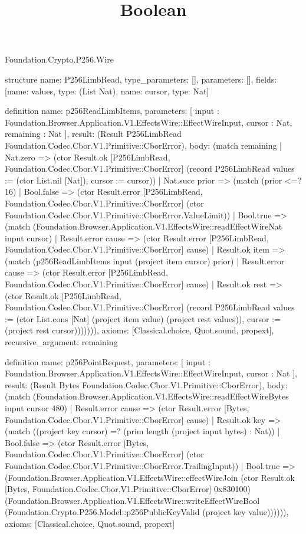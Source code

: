\begin{lexlean}{Foundation.Crypto.P256.Wire}
\title{Boolean}
\begin{semanticmodule}
structure{
  name: P256LimbRead,
  type_parameters: [],
  parameters: [],
  fields: [{name: values, type: (List Nat)}, {name: cursor, type: Nat}]
}

definition{
  name: p256ReadLimbItems,
  parameters: [
    input : Foundation.Browser.Application.V1.EffectsWire::EffectWireInput,
    cursor : Nat,
    remaining : Nat
  ],
  result: (Result P256LimbRead Foundation.Codec.Cbor.V1.Primitive::CborError),
  body: (match remaining
    | Nat.zero => (ctor Result.ok [P256LimbRead, Foundation.Codec.Cbor.V1.Primitive::CborError] (record P256LimbRead {values := (ctor List.nil [Nat]), cursor := cursor}))
    | Nat.succ prior => (match (prior <=? 16)
      | Bool.false => (ctor Result.error [P256LimbRead, Foundation.Codec.Cbor.V1.Primitive::CborError] (ctor Foundation.Codec.Cbor.V1.Primitive::CborError.ValueLimit))
      | Bool.true => (match (Foundation.Browser.Application.V1.EffectsWire::readEffectWireNat input cursor)
        | Result.error cause => (ctor Result.error [P256LimbRead, Foundation.Codec.Cbor.V1.Primitive::CborError] cause)
        | Result.ok item => (match (p256ReadLimbItems input (project item cursor) prior)
          | Result.error cause => (ctor Result.error [P256LimbRead, Foundation.Codec.Cbor.V1.Primitive::CborError] cause)
          | Result.ok rest => (ctor Result.ok [P256LimbRead, Foundation.Codec.Cbor.V1.Primitive::CborError] (record P256LimbRead {values := (ctor List.cons [Nat] (project item value) (project rest values)), cursor := (project rest cursor)})))))),
  axioms: [Classical.choice, Quot.sound, propext],
  recursive_argument: remaining
}

definition{
  name: p256PointRequest,
  parameters: [
    input : Foundation.Browser.Application.V1.EffectsWire::EffectWireInput,
    cursor : Nat
  ],
  result: (Result Bytes Foundation.Codec.Cbor.V1.Primitive::CborError),
  body: (match (Foundation.Browser.Application.V1.EffectsWire::readEffectWireBytes input cursor 480)
    | Result.error cause => (ctor Result.error [Bytes, Foundation.Codec.Cbor.V1.Primitive::CborError] cause)
    | Result.ok key => (match ((project key cursor) =? (prim length (project input bytes) : Nat))
      | Bool.false => (ctor Result.error [Bytes, Foundation.Codec.Cbor.V1.Primitive::CborError] (ctor Foundation.Codec.Cbor.V1.Primitive::CborError.TrailingInput))
      | Bool.true => (Foundation.Browser.Application.V1.EffectsWire::effectWireJoin (ctor Result.ok [Bytes, Foundation.Codec.Cbor.V1.Primitive::CborError] 0x830100) (Foundation.Browser.Application.V1.EffectsWire::writeEffectWireBool (Foundation.Crypto.P256.Model::p256PublicKeyValid (project key value)))))),
  axioms: [Classical.choice, Quot.sound, propext]
}


\end{semanticmodule}
\end{lexlean}
